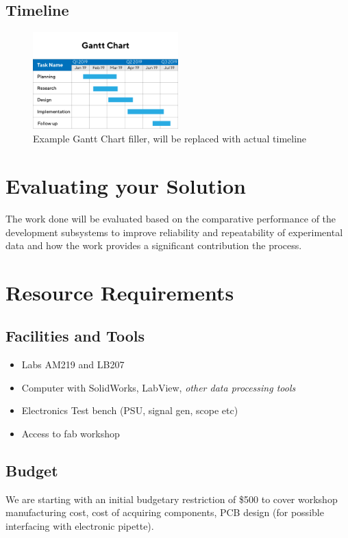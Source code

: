 \documentclass[11pt, a4paper, twoside, openright]{report}
\begin{document}
\subsection{Timeline}
\begin{figure}[h]
  \centering
  \includegraphics[width=0.5\textwidth]{Figures/Gantt-chart_filler.png}
  \caption{Example Gantt Chart filler, will be replaced with actual timeline}
\end{figure}

\section{Evaluating your Solution}
The work done will be evaluated based on the comparative performance of the development subsystems to improve reliability and repeatability of experimental data and how the work provides a significant contribution the process. 

\section{Resource Requirements}


\subsection{Facilities and Tools}
\begin{itemize}
  \item Labs AM219 and LB207
  \item Computer with SolidWorks, LabView, \textit{other data processing tools}
  \item Electronics Test bench (PSU, signal gen, scope etc)
  \item Access to fab workshop
\end{itemize}

\subsection{Budget}
We are starting with an initial budgetary restriction of \$500 to cover workshop manufacturing cost, cost of acquiring components, PCB design (for possible interfacing with electronic pipette). 
\end{document}
